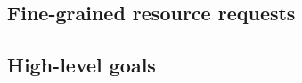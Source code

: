 

\subsection{\texorpdfstring{}{Virtual Cluster (VC)}}


\subsection{\texorpdfstring{}{Virtual Oversubscribed Cluster (VOC)}} \label{voc_analysis}


\subsection{\texorpdfstring{}{Tenant Application Graph (TAG)}}


\subsection{Fine-grained resource requests}


\subsection{High-level goals} \label{hlg_analysis}
